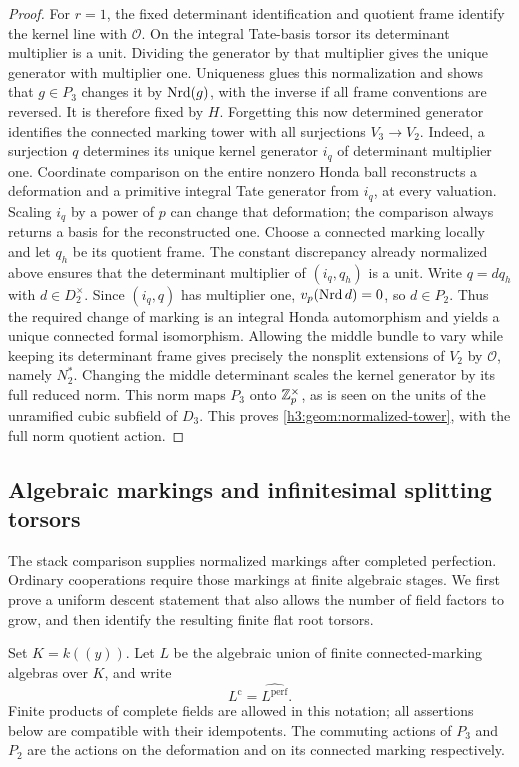 \begin{proof}
For $r=1$, the fixed determinant identification and quotient frame
identify the kernel line with $\mathcal O$.  On the integral
Tate-basis torsor its determinant multiplier is a unit.  Dividing
the generator by that multiplier gives the unique generator with
multiplier one.  Uniqueness glues this normalization and shows
that $g\in P_3$ changes it by $\operatorname{Nrd}(g)$, with the inverse if all
frame conventions are reversed.  It is therefore fixed by $H$.
Forgetting this now determined generator identifies the connected
marking tower with all surjections $V_3\to V_2$.  Indeed, a
surjection $q$ determines its unique kernel generator $i_q$
of determinant multiplier one.  Coordinate comparison on the
entire nonzero Honda ball reconstructs a deformation and a
primitive integral Tate generator from $i_q$, at every valuation.
Scaling $i_q$ by a power of $p$ can change that deformation;
the comparison always returns a basis for the reconstructed one.
Choose a connected marking locally and let $q_h$ be its quotient
frame.  The constant discrepancy already normalized above
ensures that the determinant multiplier of $(i_q,q_h)$ is a
unit.  Write $q=dq_h$ with $d\in D_2^\times$.  Since
$(i_q,q)$ has multiplier one, $v_p(\operatorname{Nrd} d)=0$, so $d\in P_2$.
Thus the required change of marking is an integral Honda
automorphism and yields a unique connected formal isomorphism.
Allowing the middle
bundle to vary while keeping its determinant frame gives precisely
the nonsplit extensions of $V_2$ by $\mathcal O$, namely $N_2^*$.
Changing the middle determinant scales the kernel generator
by its full reduced norm.  This norm maps $P_3$ onto
$\mathbb Z_p^\times$, as is seen on the units of the unramified
cubic subfield of $D_3$.
This proves \eqref{h3:geom:normalized-tower}, with the full norm
quotient action.
\end{proof}

\subsection{Algebraic markings and infinitesimal splitting torsors}

The stack comparison supplies normalized markings after completed
perfection.  Ordinary cooperations require those markings at finite
algebraic stages.  We first prove a uniform descent statement that also
allows the number of field factors to grow, and then identify the
resulting finite flat root torsors.

Set $K=k((y))$.  Let $L$ be the algebraic union of finite
connected-marking algebras over $K$, and write
\[
 L^{\mathrm c}=\widehat{L^{\mathrm{perf}}}.
\]
Finite products of complete fields are allowed in this notation;
all assertions below are compatible with their idempotents.  The
commuting actions of $P_3$ and $P_2$ are the actions on the
deformation and on its connected marking respectively.

